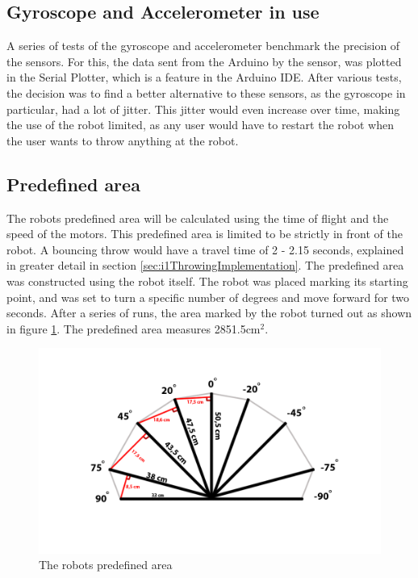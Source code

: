 \subsection{Gyroscope and Accelerometer in use}
\label{sec:i1Gyroscope and Accelerometer in use}
A series of tests of the gyroscope and accelerometer benchmark the precision of the sensors. For this, the data sent from the Arduino by the sensor, was plotted in the Serial Plotter, which is a feature in the Arduino IDE. After various tests, the decision was to find a better alternative to these sensors, as the gyroscope in particular, had a lot of jitter. This jitter would even increase over time, making the use of the robot limited, as any user would have to restart the robot when the user wants to throw anything at the robot.

\subsection{Predefined area}
\label{sec:i1Predefined areaImplementation}
The robots predefined area will be calculated using the time of flight and the speed of the motors. 
This predefined area is limited to be strictly in front of the robot.
A bouncing throw would have a travel time of 2 - 2.15 seconds, explained in greater detail in section \ref{sec:i1ThrowingImplementation}. The predefined area was constructed using the robot itself. The robot was placed marking its starting point, and was set to turn a specific number of degrees and move forward for two seconds. After a series of runs, the area marked by the robot turned out as shown in figure \ref{figure:Predefined area}. The predefined area measures 2851.5cm\begin{math}^2\end{math}.

\begin{figure}[h]
\centering
\includegraphics[scale=0.35]{billeder/predefined-area}
\caption{The robots predefined area}
\label{figure:Predefined area}
\end{figure}


